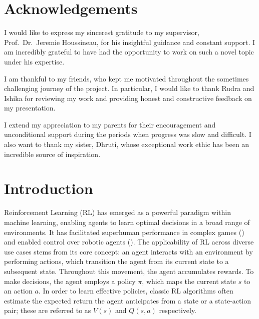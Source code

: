 \documentclass[11pt,a4paper]{report}
\begin{document}
\chapter*{Acknowledgements}
I would like to express my sincerest gratitude to my supervisor, Prof.\ Dr.\ Jeremie Houssineau, for his insightful guidance and constant support. I am incredibly grateful to have had the opportunity to work on such a novel topic under his expertise. \par

I am thankful to my friends, who kept me motivated throughout the sometimes challenging journey of the project. In particular, I would like to thank Rudra and Ishika for reviewing my work and providing honest and constructive feedback on my presentation. \par

I extend my appreciation to my parents for their encouragement and unconditional support during the periods when progress was slow and difficult. I also want to thank my sister, Dhruti, whose exceptional work ethic has been an incredible source of inspiration. \par


\tableofcontents

\chapter{Introduction}
Reinforcement Learning (RL) has emerged as a powerful paradigm within machine learning, enabling agents to learn optimal decisions in a broad range of environments. It has facilitated superhuman performance in complex games (\cite{silver2017masteringchessshogiselfplay}) and enabled control over robotic agents (\cite{Liu_2021}). The applicability of RL across diverse use cases stems from its core concept: an agent interacts with an environment by performing actions, which transition the agent from its current state to a subsequent state. Throughout this movement, the agent accumulates rewards. To make decisions, the agent employs a policy $\pi$, which maps the current state $s$ to an action $a$. In order to learn effective policies, classic RL algorithms often estimate the expected return the agent anticipates from a state or a state-action pair; these are referred to as $V(s)$ and $Q(s,a)$ respectively.
\end{document}
